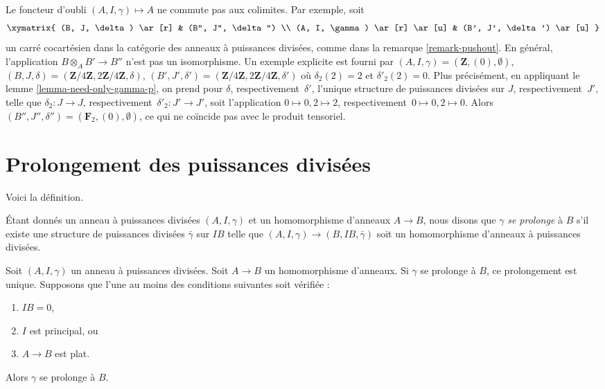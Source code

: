 \begin{remark}

\label{remark-forgetful}

Le foncteur d'oubli $(A, I, \gamma) \mapsto A$ ne commute pas aux colimites. Par exemple, soit
$$
\xymatrix{
(B, J, \delta) \ar[r] & (B'', J'', \delta'') \\
(A, I, \gamma) \ar[r] \ar[u] & (B', J', \delta') \ar[u]
}
$$
un carré cocartésien dans la catégorie des anneaux à puissances divisées, comme dans la remarque \ref{remark-pushout}. En général, l'application
$B \otimes_A B' \to B''$ n'est pas un isomorphisme. Un exemple explicite est fourni par
$(A, I, \gamma) = (\mathbf{Z}, (0), \emptyset)$,
$(B, J, \delta) = (\mathbf{Z}/4\mathbf{Z}, 2\mathbf{Z}/4\mathbf{Z}, \delta)$,
$(B', J', \delta') =
(\mathbf{Z}/4\mathbf{Z}, 2\mathbf{Z}/4\mathbf{Z}, \delta')$
où $\delta_2(2) = 2$ et $\delta'_2(2) = 0$. Plus précisément, en appliquant le lemme \ref{lemma-need-only-gamma-p},
on prend pour $\delta$, respectivement\ $\delta'$, l'unique structure de puissances divisées sur $J$, respectivement\ $J'$, telle que
$\delta_2 : J \to J$, respectivement\ $\delta'_2 : J' \to J'$, soit l'application $0 \mapsto 0, 2 \mapsto 2$, respectivement\ $0 \mapsto 0, 2 \mapsto 0$. Alors $(B'', J'', \delta'') = (\mathbf{F}_2, (0), \emptyset)$,
ce qui ne coïncide pas avec le produit tensoriel.

\end{remark}

\section{Prolongement des puissances divisées}

\label{section-extend}

\noindent
Voici la définition.

\begin{definition}

\label{definition-extends}
Étant donnés un anneau à puissances divisées $(A, I, \gamma)$ et un homomorphisme d'anneaux $A \to B$, nous disons que $\gamma$ {\it se prolonge} à $B$ s'il existe une structure de puissances divisées $\bar \gamma$ sur $IB$ telle que $(A, I, \gamma) \to (B, IB, \bar\gamma)$ soit un homomorphisme d'anneaux à puissances divisées.
\end{definition}

\begin{lemma}

\label{lemma-gamma-extends}
Soit $(A, I, \gamma)$ un anneau à puissances divisées. Soit $A \to B$ un homomorphisme d'anneaux. Si $\gamma$ se prolonge à $B$, ce prolongement est unique. Supposons que l'une au moins des conditions suivantes soit vérifiée :
\begin{enumerate}
\item $IB = 0$,
\item $I$ est principal, ou
\item $A \to B$ est plat.
\end{enumerate}
Alors $\gamma$ se prolonge à $B$.
\end{lemma}

